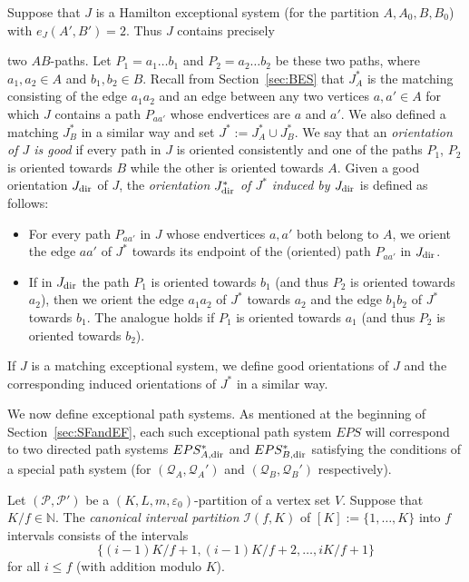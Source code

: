\documentclass{memo-l}
\def\COMMENT#1{}
\def\eps{\varepsilon}
\def\epszero{\eps_0}
\numberwithin{section}{chapter}
\numberwithin{equation}{section}
\numberwithin{firstthm}{section}
\numberwithin{figure}{section}
\begin{document}
Suppose that $J$ is a Hamilton exceptional system (for the partition $A,A_0,B,B_0$) with $e_J(A',B')=2$.
Thus $J$ contains precisely%
    \COMMENT{Daniela: had "two paths having one endvertex in $A$ and the other endvertex in $B$" instead of "$AB$-paths"}
two $AB$-paths. Let $P_1=a_1\dots b_1$ and $P_2=a_2\dots b_2$ be these two paths, where $a_1,a_2\in A$ and $b_1,b_2\in B$.
Recall from Section~\ref{sec:BES} that $J^*_A$ is the matching consisting of the edge $a_1a_2$ and an edge
between any two vertices $a,a'\in A$ for which $J$ contains a path $P_{aa'}$ whose endvertices are $a$ and $a'$. 
We also defined a matching $J^*_B$ in a similar way and set $J^*:=J^*_A\cup J^*_B$.
We say that an \emph{orientation of $J$ is good} if every path in $J$ is oriented consistently and
one of the paths $P_1$, $P_2$ is oriented towards $B$ while the other is oriented towards $A$.
Given a good orientation $J_{\rm dir}$ of $J$, the \emph{orientation $J^*_{\rm dir}$ of $J^*$ induced by $J_{\rm dir}$} is defined as follows:
\begin{itemize}
\item For every path $P_{aa'}$ in $J$ whose endvertices $a,a'$ both belong to $A$, we orient the edge $aa'$ of $J^*$
towards its endpoint of the (oriented) path $P_{aa'}$ in $J_{\rm dir}$.
\item If in $J_{\rm dir}$ the path $P_1$ is oriented towards $b_1$ (and thus $P_2$ is oriented towards $a_2$),
 then we orient the edge $a_1a_2$ of $J^*$ towards $a_2$ and the edge $b_1b_2$ of $J^*$ towards $b_1$.
The analogue holds if $P_1$ is oriented towards $a_1$ (and thus $P_2$ is oriented towards $b_2$).
\end{itemize}
If $J$ is a matching exceptional system, we define good orientations of $J$ and the corresponding
induced orientations of $J^*$ in a similar way.

We now define exceptional path systems. As mentioned at the beginning of Section~\ref{sec:SFandEF}, each such exceptional
path system $EPS$ will correspond to two directed path systems $EPS^*_{A,{\rm dir}}$ and $EPS^*_{B, {\rm dir}}$
satisfying the conditions of a special path system (for $(\mathcal{Q}_A, \mathcal{Q}_A')$ and
$(\mathcal{Q}_B, \mathcal{Q}_B')$ respectively).

Let $(\mathcal{P},\mathcal{P'})$ be a $(K,L,m, \epszero)$-partition of a vertex set $V$.
Suppose that $K/f\in\mathbb{N}$. The \emph{canonical interval partition} $\mathcal{I}(f,K)$ of $[K]:=\{1,\dots,K\}$ into $f$ intervals
consists of the intervals $$\{(i-1)K/f+1, (i-1)K/f+2, \dots, iK/f+1\}$$ for all $i\le f$ (with addition modulo $K$).
\end{document}
